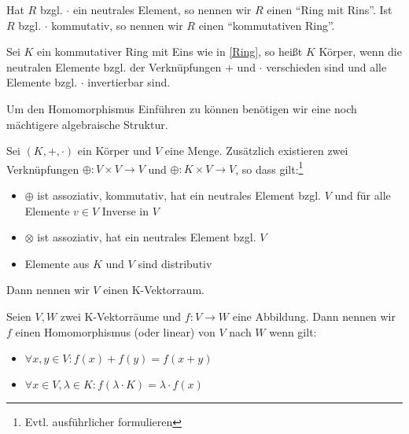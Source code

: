 Hat $R$ bzgl. $\cdot$ ein neutrales Element, so nennen wir $R$ einen \enquote{Ring mit Rins}. Ist $R$ bzgl. $\cdot$ kommutativ, so nennen wir $R$ einen \enquote{kommutativen Ring}. 

\begin{theorem}[Körper]
	Sei $K$ ein kommutativer Ring mit Eins wie in \ref{Ring}, so heißt $K$ Körper, wenn die neutralen Elemente bzgl. der Verknüpfungen $+$ und $\cdot$ verschieden sind und alle Elemente bzgl. $\cdot$ invertierbar sind.
	
\end{theorem}

Um den Homomorphismus Einführen zu können benötigen wir eine noch mächtigere algebraische Struktur.

\begin{theorem}[K-Vektorraum]
	Sei $(K,+,\cdot)$ ein Körper und $V$ eine Menge. Zusätzlich existieren zwei Verknüpfungen $\oplus: V\times V \rightarrow V$ und $\oplus: K\times V \rightarrow V$, so dass gilt:\footnote{Evtl. ausführlicher formulieren}
	\begin{itemize}
		\item $\oplus$ ist assoziativ, kommutativ, hat ein neutrales Element bzgl. $V$ und für alle Elemente $v\in V$ Inverse in $V$
		\item $\otimes$ ist assoziativ, hat ein neutrales Element bzgl. $V$
		\item Elemente aus $K$ und $V$ sind distributiv
	\end{itemize}
	Dann nennen wir $V$ einen K-Vektorraum.
\end{theorem}

\begin{theorem}[Homomorphismus]
\label{Homomorphismus}
	Seien $V,W$ zwei K-Vektorräume und $f:V\rightarrow W$ eine Abbildung. Dann nennen wir $f$ einen Homomorphismus (oder linear) von $V$ nach $W$ wenn gilt:
	\begin{itemize}
		\item $\forall x,y\in V : f(x)+f(y) = f(x+y)$
		\item $\forall x\in V, \lambda\in K: f(\lambda\cdot K)=\lambda\cdot f(x)$
	\end{itemize}
\end{theorem}

